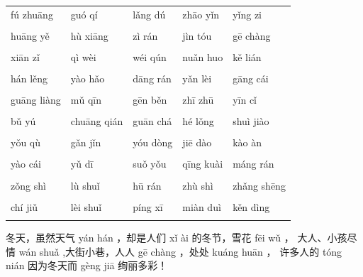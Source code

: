 \documentclass[UTF8]{ctexart}
\newcommand{\khao}{\kh[1.5cm]}
\begin{document}
\begin{tabularx}{46em}%
{*{5}{>{\centering\arraybackslash}X}}
fú zhuāng & guó qí & lǎng dú & zhāo yǐn & yǐng zi \\
\khao &  \khao & \khao & \khao & \khao \\

huāng yě & hù xiāng & zì rán & jìn tóu & gē chàng \\
\khao &  \khao & \khao & \khao & \khao \\

xiān zǐ & qì wèi & wéi qún & nuǎn huo & kě lián \\
\khao &  \khao & \khao & \khao & \khao \\

hán lěng & yào hǎo & dāng rán & yǎn lèi & gāng cái \\
\khao &  \khao & \khao & \khao & \khao \\

guāng liàng & mǔ qīn & gēn běn & zhī zhū & yīn cǐ \\
\khao &  \khao & \khao & \khao & \khao \\

bǔ yú & chuāng qián & guān chá & hé lǒng & shuì jiào \\
\khao &  \khao & \khao & \khao & \khao \\

yǒu qù & gǎn jǐn & yóu dòng & jiē dào & kào àn \\
\khao &  \khao & \khao & \khao & \khao \\

yào cái & yǔ dī & suǒ yǒu & qīng kuài & máng rán \\
\khao &  \khao & \khao & \khao & \khao \\

zǒng shì & lù shuǐ & hū rán & zhù shì & zhǎng shēng \\
\khao &  \khao & \khao & \khao & \khao \\

chí jiǔ & lèi shuǐ & píng xī & miàn duì & kěn dìng \\
\khao &  \khao & \khao & \khao & \khao \\
\end{tabularx}



冬天，虽然天气 yán hán \khao ，却是人们 xǐ ài \khao 的冬节，雪花 fēi wǔ \khao ，
大人、小孩尽情 wán shuǎ \khao ,大街小巷，人人 gē chàng \khao ，处处 kuáng huān \khao ，
许多人的 tóng nián \khao 因为冬天而 gèng jiā \khao 绚丽多彩！
\end{document}
